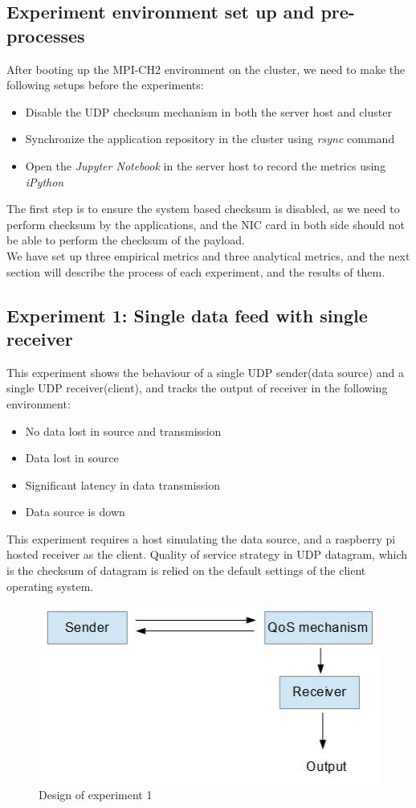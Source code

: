 \documentclass[11pt,openright,a4paper]{report}
\begin{document}
\subsection{Experiment environment set up and pre-processes}
After booting up the MPI-CH2 environment on the cluster, we need to make the following setups before the experiments:
\begin{itemize}
	\item Disable the UDP checksum mechanism in both the server host and cluster
	\item Synchronize the application repository in the cluster using \textit{rsync} command
	\item Open the \textit{Jupyter Notebook} in the server host to record the metrics using \textit{iPython} 
\end{itemize}
The first step is to ensure the system based checksum is disabled, as we need to perform checksum by the applications, and the NIC card in both side should not be able to perform the checksum of the payload.\\
We have set up three empirical metrics and three analytical metrics, and the next section will describe the process of each experiment, and the results of them.

\subsection{Experiment 1: Single data feed with single receiver}
This experiment shows the behaviour of a single UDP sender(data source) and a single UDP receiver(client), and tracks the output of receiver in the following environment:
\begin{itemize}
	\item No data lost in source and transmission
	\item Data lost in source
	\item Significant latency in data transmission
	\item Data source is down
\end{itemize} 
This experiment requires a host simulating the data source, and a raspberry pi hosted receiver as the client. Quality of service strategy in UDP datagram, which is the checksum of datagram is relied on the default settings of the client operating system.\\
\begin{figure}[H]
\centering
\includegraphics[width=0.5\linewidth]{picture/Exp1}
\caption{Design of experiment 1}
\label{fig:Exp1}
\end{figure}
\end{document}
